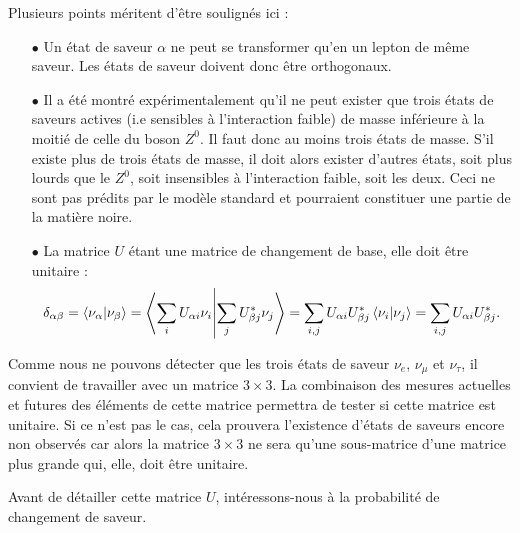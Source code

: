         Plusieurs points méritent d'être soulignés ici :
        \begin{itemize}
          \item[$\bullet$] Un état de saveur $\alpha$ ne peut se transformer qu'en un lepton de même saveur. Les états de saveur doivent donc être orthogonaux.
          \item[$\bullet$] Il a été montré expérimentalement qu'il ne peut exister que trois états de saveurs actives (i.e sensibles à l'interaction faible)\cite{pdg2018} de masse inférieure à la moitié de celle du boson $Z^0$. Il faut donc au moins trois états de masse. S'il existe plus de trois états de masse, il doit alors exister d'autres états, soit plus lourds que le $Z^0$, soit insensibles à l'interaction faible, soit les deux. Ceci ne sont pas prédits par le modèle standard et pourraient constituer une partie de la matière noire.
          \item[$\bullet$] La matrice $U$ étant une matrice de changement de base, elle doit être unitaire :
          \begin{equation*}
            \delta_{\alpha\beta} = \braket{\nu_{\alpha}}{\nu_{\beta}} = \braket{\sum_i U_{\alpha i}\nu_i}{\sum_j U_{\beta j}^*\nu_j} = \sum_{i,j} U_{\alpha i}U_{\beta j}^* \braket{\nu_i}{\nu_j} = \sum_{i,j} U_{\alpha i}U_{\beta j}^*.
          \end{equation*}
        \end{itemize}
        Comme nous ne pouvons détecter que les trois états de saveur $\nu_e$, $\nu_{\mu}$ et $\nu_{\tau}$, il convient de travailler avec un matrice $3\times3$. La combinaison des mesures actuelles et futures des éléments de cette matrice\cite{Qian2013} permettra de tester si cette matrice est unitaire. Si ce n'est pas le cas, cela prouvera l'existence d'états de saveurs encore non observés car alors la matrice $3\times3$ ne sera qu'une sous-matrice d'une matrice plus grande qui, elle, doit être unitaire.
        
        Avant de détailler cette matrice $U$, intéressons-nous à la probabilité de changement de saveur.

